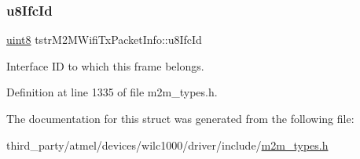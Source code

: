 \mbox{\label{structtstrM2MWifiTxPacketInfo_a87f26b61d68dde10573a1b260452bc78}} 
\subsubsection{\texorpdfstring{u8\+Ifc\+Id}{u8IfcId}}
{\footnotesize\ttfamily \hyperlink{group__DataT_ga4df709a77647e870bbf1d955b8edc9a6}{uint8} tstr\+M2\+M\+Wifi\+Tx\+Packet\+Info\+::u8\+Ifc\+Id}

Interface ID to which this frame belongs. 

Definition at line 1335 of file m2m\+\_\+types.\+h.



The documentation for this struct was generated from the following file\+:\begin{DoxyCompactItemize}
\item 
third\+\_\+party/atmel/devices/wilc1000/driver/include/\hyperlink{m2m__types_8h}{m2m\+\_\+types.\+h}\end{DoxyCompactItemize}
